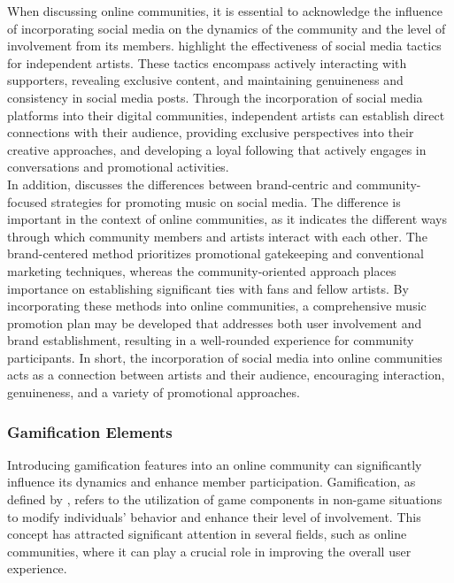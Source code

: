 When discussing online communities, it is essential to acknowledge the influence of incorporating social media on the dynamics of the community and the level of involvement from its members. \textcite{zanuar22} highlight the effectiveness of social media tactics for independent artists. These tactics encompass actively interacting with supporters, revealing exclusive content, and maintaining genuineness and consistency in social media posts. Through the incorporation of social media platforms into their digital communities, independent artists can establish direct connections with their audience, providing exclusive perspectives into their creative approaches, and developing a loyal following that actively engages in conversations and promotional activities. \\

In addition, \textcite{jarvekulg21} discusses the differences between brand-centric and community-focused strategies for promoting music on social media. The difference is important in the context of online communities, as it indicates the different ways through which community members and artists interact with each other. The brand-centered method prioritizes promotional gatekeeping and conventional marketing techniques, whereas the community-oriented approach places importance on establishing significant ties with fans and fellow artists. By incorporating these methods into online communities, a comprehensive music promotion plan may be developed that addresses both user involvement and brand establishment, resulting in a well-rounded experience for community participants. In short, the incorporation of social media into online communities acts as a connection between artists and their audience, encouraging interaction, genuineness, and a variety of promotional approaches.

\subsubsection{Gamification Elements}
Introducing gamification features into an online community can significantly influence its dynamics and enhance member participation. Gamification, as defined by \textcite{hsu18}, refers to the utilization of game components in non-game situations to modify individuals' behavior and enhance their level of involvement. This concept has attracted significant attention in several fields, such as online communities, where it can play a crucial role in improving the overall user experience. \\

